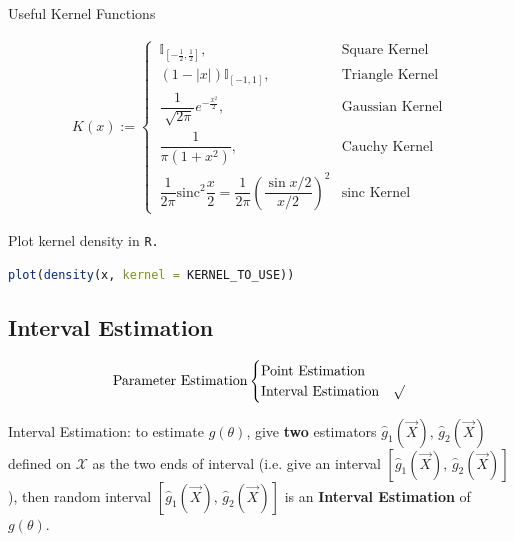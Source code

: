     

\begin{point}
        Useful Kernel Functions
\end{point}

    
    \begin{align}
        K(x):=\begin{cases}
            \,\mathbb{I}_{[-\frac{1}{2},\frac{1}{2}]},&\text{Square Kernel}\\
            \,(1-|x|)\mathbb{I}_{[-1,1]},&\text{Triangle Kernel}\\
            \,\dfrac{1}{\sqrt[]{2\pi}}e^{-\frac{x^2}{2}},&\text{Gaussian Kernel}\\
            \,\dfrac{1}{\pi(1+x^2)},&\text{Cauchy Kernel}\\
            \,\dfrac{1}{2\pi}\mathrm{sinc}^2\dfrac{x}{2}=\dfrac{1}{2\pi}\left(\dfrac{\sin x/2}{x/2}\right)^2&\text{sinc Kernel}
        \end{cases} 
    \end{align}
    

\begin{rcode}
    Plot kernel density in \lstinline|R.| 
\begin{lstlisting}[language=R]
plot(density(x, kernel = KERNEL_TO_USE))
\end{lstlisting}
\end{rcode}






\subsection{Interval Estimation}\label{SectionIntervalEstimation}
\begin{equation}
    \text{Parameter Estimation}\begin{cases}
        \text{Point Estimation}& \\
        \text{Interval Estimation}& \surd
    \end{cases}    
\end{equation}

    Interval Estimation: to estimate $g(\theta)$, give \textbf{two} estimators $\hat{g}_1(\vec{X}),\, \hat{g}_2(\vec{X})$ defined on $\mathscr{X}$ as the two ends of interval (i.e. give an interval $[\hat{g}_1(\vec{X}),\, \hat{g}_2(\vec{X})]$), then random interval $[\hat{g}_1(\vec{X}),\, \hat{g}_2(\vec{X})]$ is an \textbf{Interval Estimation} of $g(\theta)$. 


